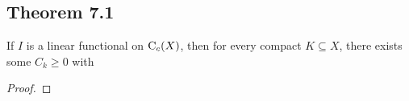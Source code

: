 \documentclass[../../main.tex]{subfiles}
\begin{document}
\subsection{Theorem 7.1}
\begin{wts}
    If $I$ is a linear functional on $\operatorname{C}_c({X})$, then for every compact $K\subseteq X$, there exists some $C_k\geq 0$ with
    
\end{wts}
\begin{proof}
    
\end{proof}
\end{document}
